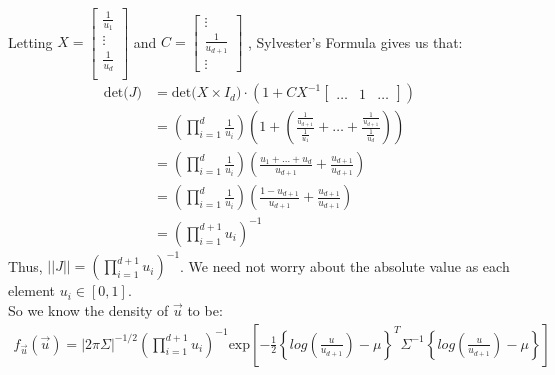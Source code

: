 \documentclass[paper=a4, fontsize=11pt]{scrartcl}
\newcommand{\parens}[1]{ \left( #1 \right) }
\begin{document}
\begin{enumerate}[1.]
\begin{enumerate}[1]
\begin{align*}
        \end{align*}
        Letting $X =  \begin{bmatrix}
                        \frac{1}{u_1} \\
                        \vdots \\
                        \frac{1}{u_d} \\
                      \end{bmatrix}$
        and $C =  \begin{bmatrix}
                    \vdots \\
                    \frac{1}{u_{d+1}} \\
                    \vdots
                  \end{bmatrix}$
        , Sylvester's Formula gives us that:
        \begin{align*}
          \mbox{det(} J \mbox{)}
              &=  \mbox{det(} X\times I_d \mbox{)} \cdot (1 + CX^{-1}\begin{bmatrix} \ldots & 1 & \ldots \end{bmatrix}) \\
              &=  \parens{ \prod_{i = 1}^{d}{\frac{1}{u_{i}}} }
                  \parens{ 1 + \parens{ \frac{\frac{1}{u_{d+1}}}{\frac{1}{u_1}} + \ldots + \frac{\frac{1}{u_{d+1}}}{\frac{1}{u_d}} } } \\
              &=  \parens{ \prod_{i = 1}^{d}{\frac{1}{u_{i}}} }
                  \parens{ \frac{u_1 + \ldots + u_d}{u_{d+1}} + \frac{u_{d+1}}{u_{d+1}} } \\
              &=  \parens{ \prod_{i = 1}^{d}{\frac{1}{u_{i}}} }
                  \parens{ \frac{1 - u_{d+1}}{u_{d+1}} + \frac{u_{d+1}}{u_{d+1}}} \\
              &=  \parens{ \prod_{i = 1}^{d+1}{u_{i}} }^{-1}
        \end{align*}
        Thus, $||J|| = \parens{ \prod_{i = 1}^{d+1}{u_{i}} }^{-1}$. We need not worry about the absolute value as each element $u_i \in [0,1]$. \\

        So we know the density of $\vec{u}$ to be:
        \begin{align*}
          f_{\vec{u}}(\vec{u}) = |2\pi \Sigma|^{-1/2}
                        \parens{ \prod_{i = 1}^{d+1}{u_{i}} }^{-1}
                        \mbox{exp}
                          \left[
                            -\frac{1}{2}
                            \left\{
                              log\parens{ \frac{u}{u_{d+1}}}-\mu \right\}^T\Sigma^{-1}\left\{log\parens{ \frac{u}{u_{d+1}} }-\mu
                            \right\}
                          \right]
        \end{align*}
    \end{enumerate}
\end{enumerate}
\end{document}
